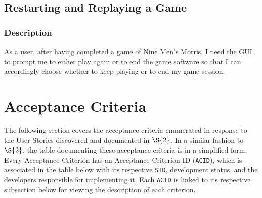 \documentclass[11pt]{article}
\begin{document}
\subsection{Restarting and Replaying a Game}
\label{sec:org5f92017}
\subsubsection*{Description}
\label{sec:org7cc06d4}
As a user, after having completed a game of Nine Men's Morris, I need the GUI to prompt me to
either play again or to end the game software so that I can accordingly choose whether to keep
playing or to end my game session.
\section{Acceptance Criteria}
\label{sec:org45ebacc}
The following section covers the acceptance criteria enumerated in response to the User Stories
discovered and documented in \hyperref[sec:org27f945a]{\(\S{2}\)}. In a similar fashion to \(\S{2}\), the table documenting these
acceptance criteria is in a simplified form. Every Acceptance Criterion has an Acceptance
Criterion ID (\texttt{ACID}), which is associated in the table below with its respective \texttt{SID}, development
status, and the developers responsible for implementing it. Each \texttt{ACID} is linked to its respective
subsection below for viewing the description of each criterion.
\end{document}
